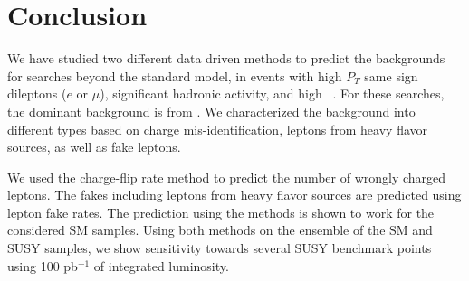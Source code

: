 \section{Conclusion}
\label{sec:conclusion}
We have studied two different data driven methods to predict the backgrounds for  
searches beyond the standard model, in events with high $P_T$ same sign dileptons
($e$ or $\mu$), significant hadronic activity, and high \met~. 
For these searches, the dominant background is from \ttbar. We characterized
the background into different types based on charge mis-identification,
leptons from heavy flavor sources, as well as fake leptons.

We used the charge-flip rate method to predict the number of wrongly charged 
leptons. The fakes including leptons from heavy flavor sources are predicted 
using lepton fake rates. The prediction using the methods is shown to work 
for the considered SM samples. Using both methods on the ensemble of the
SM and SUSY samples, we show sensitivity towards several SUSY benchmark 
points using 100 pb$^{-1}$ of integrated luminosity. 



